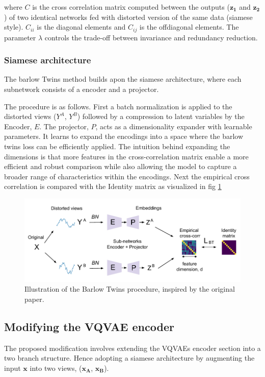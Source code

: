 where $C$ is the cross correlation matrix computed between the outputs ($\mathbf{z_1}$ and $\mathbf{z_2}$) of two identical networks fed with distorted version of the same data (siamese style). $C_{ii}$ is the diagonal elements and $C_{ij}$ is the offdiagonal elements.
The parameter $\lambda$ controls the trade-off between invariance and redundancy reduction.

\subsubsection{Siamese architecture}
The barlow Twins method builds apon the siamese architecture, where each subnetwork consists of a encoder and a projector.

The procedure is as follows. First a batch normalization is applied to the distorted views ($Y^A$, $Y^B$) followed by a compression to latent variables by the Encoder, $E$. The projector, $P$, acts as a dimensionality expander with learnable parameters. It learns to expand the encodings into a space where the barlow twins loss can be efficiently applied.
The intuition behind expanding the dimensions is that more features in the cross-correlation matrix enable a more efficient and robust comparison while also allowing the model to capture a broader range of characteristics within the encodings.
Next the empirical cross correlation is compared with the Identity matrix as visualized in fig \ref{fig:Barlow}

\begin{figure}[H]
    \includegraphics[scale=0.8]{figures/figure-pdf/BarlowT.pdf}
    \caption{Illustration of the Barlow Twins procedure, inspired by the original paper\cite{Barlow}.}
    \label{fig:Barlow}
\end{figure}

\subsection{Modifying the VQVAE encoder}
The proposed modification involves extending the VQVAEs encoder section into a two branch structure. Hence adopting a siamese architecture by augmenting 
the input $\mathbf{x}$ into two views, ($\mathbf{x_A}$, $\mathbf{x_B}$).

